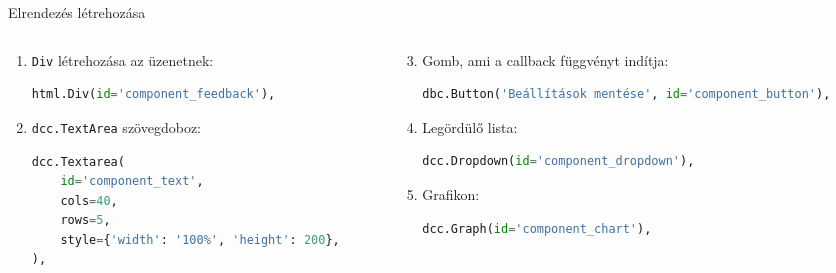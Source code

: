 \documentclass[english, aspectratio=169]{beamer}
\begin{document}
\begin{frame}[fragile]{Elrendezés létrehozása}
	\begin{columns}
		\begin{column}{.5\textwidth}
			\begin{enumerate}
				\item \texttt{Div} létrehozása az üzenetnek:
				\begin{lstlisting}[language=python]
html.Div(id='component_feedback'),
				\end{lstlisting}
				\item \texttt{dcc.TextArea} szövegdoboz:
				\begin{lstlisting}[language=python]
dcc.Textarea(
	id='component_text',
	cols=40,
	rows=5,
	style={'width': '100%', 'height': 200},
),
				\end{lstlisting}
			\end{enumerate}
		\end{column}
		\begin{column}{.5\textwidth}
			\begin{enumerate}
				\setcounter{enumi}{2}
				\item Gomb, ami a callback függvényt indítja:
				\begin{lstlisting}[language=python]
dbc.Button('Beállítások mentése', id='component_button'),
				\end{lstlisting}
				\item Legördülő lista:
				\begin{lstlisting}[language=python]
dcc.Dropdown(id='component_dropdown'),
				\end{lstlisting}
				\item Grafikon:
				\begin{lstlisting}[language=python]
dcc.Graph(id='component_chart'),
				\end{lstlisting}
			\end{enumerate}
		\end{column}
	\end{columns}
\end{frame}
\end{document}
